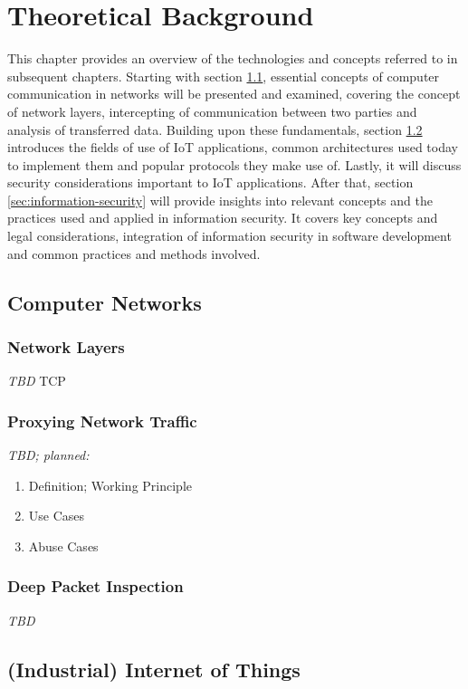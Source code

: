 \chapter{Theoretical Background}
\label{chap:theoretical-background}
This chapter provides an overview of the technologies and concepts referred to in subsequent chapters.
Starting with section \ref{sec:computer-networks}, essential concepts of computer communication in networks will be presented and examined, covering the concept of network layers, intercepting of communication between two parties and analysis of transferred data.
Building upon these fundamentals, section \ref{sec:internet-of-things} introduces the fields of use of \ac{IoT} applications, common architectures used today to implement them and popular protocols they make use of. Lastly, it will discuss security considerations important to \ac{IoT} applications.
After that, section \ref{sec:information-security} will provide insights into relevant concepts and the practices used and applied in information security. It covers key concepts and legal considerations, integration of information security in software development and common practices and methods involved. 

\section{Computer Networks}
\label{sec:computer-networks}
\subsection{Network Layers}
\emph{TBD} %
\ac{TCP}

\subsection{Proxying Network Traffic}
\emph{TBD; planned:} %
\begin{enumerate}
    \item Definition; Working Principle
    \item Use Cases
    \item Abuse Cases
\end{enumerate}

\subsection{Deep Packet Inspection}
\emph{TBD} %

\section{(Industrial) Internet of Things}
\label{sec:internet-of-things}

